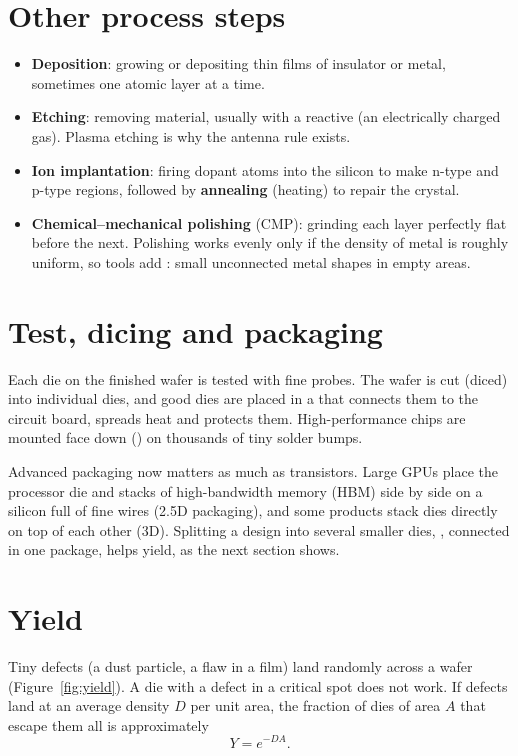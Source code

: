 \section{Other process steps}

\begin{itemize}
  \item \textbf{Deposition}: growing or depositing thin films of insulator or metal, sometimes one atomic layer at a time.
  \item \textbf{Etching}: removing material, usually with a reactive  (an electrically charged gas). Plasma etching is why the antenna rule exists.
  \item \textbf{Ion implantation}: firing dopant atoms into the silicon to make n-type and p-type regions, followed by \textbf{annealing} (heating) to repair the crystal.
  \item \textbf{Chemical--mechanical polishing} (CMP): grinding each layer perfectly flat before the next. Polishing works evenly only if the density of metal is roughly uniform, so tools add : small unconnected metal shapes in empty areas.
\end{itemize}

\section{Test, dicing and packaging}

Each die on the finished wafer is tested with fine probes. The wafer is cut (diced) into individual dies, and good dies are placed in a  that connects them to the circuit board, spreads heat and protects them. High-performance chips are mounted face down () on thousands of tiny solder bumps.

Advanced packaging now matters as much as transistors. Large GPUs place the processor die and stacks of high-bandwidth memory (HBM) side by side on a silicon  full of fine wires (2.5D packaging), and some products stack dies directly on top of each other (3D). Splitting a design into several smaller dies, , connected in one package, helps yield, as the next section shows.

\section{Yield}

Tiny defects (a dust particle, a flaw in a film) land randomly across a wafer (Figure~\ref{fig:yield}). A die with a defect in a critical spot does not work. If defects land at an average density $D$ per unit area, the fraction of dies of area $A$ that escape them all is approximately
\[
  Y = e^{-D A}.
\]

